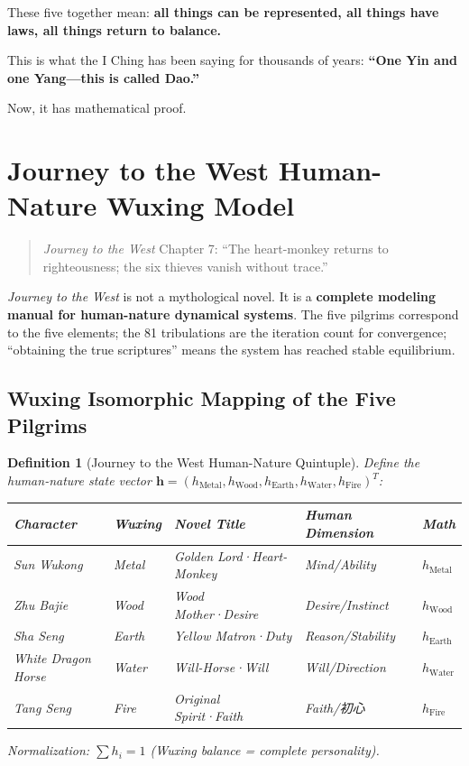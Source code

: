 \documentclass[conference]{IEEEtran}
\newtheorem{definition}[theorem]{Definition}
\theoremstyle{remark}
\begin{document}
These five together mean: \textbf{all things can be represented, all things have laws, all things return to balance.}

This is what the I Ching has been saying for thousands of years: \textbf{``One Yin and one Yang---this is called Dao.''}

Now, it has mathematical proof.

\section{Journey to the West Human-Nature Wuxing Model}

\begin{quote}
\emph{Journey to the West} Chapter 7: ``The heart-monkey returns to righteousness; the six thieves vanish without trace.''
\end{quote}

\emph{Journey to the West} is not a mythological novel. It is a \textbf{complete modeling manual for human-nature dynamical systems}. The five pilgrims correspond to the five elements; the 81 tribulations are the iteration count for convergence; ``obtaining the true scriptures'' means the system has reached stable equilibrium.

\subsection{Wuxing Isomorphic Mapping of the Five Pilgrims}

\begin{definition}[Journey to the West Human-Nature Quintuple]
Define the human-nature state vector $\mathbf{h} = (h_{\text{Metal}}, h_{\text{Wood}}, h_{\text{Earth}}, h_{\text{Water}}, h_{\text{Fire}})^T$:

\vspace{4pt}
\begin{tabular}{p{2cm}p{1cm}p{2cm}p{2.2cm}p{1.8cm}}
\toprule
Character & Wuxing & Novel Title & Human Dimension & Math \\
\midrule
Sun Wukong & Metal & Golden Lord·Heart-Monkey & Mind/Ability & $h_{\text{Metal}}$ \\
Zhu Bajie & Wood & Wood Mother·Desire & Desire/Instinct & $h_{\text{Wood}}$ \\
Sha Seng & Earth & Yellow Matron·Duty & Reason/Stability & $h_{\text{Earth}}$ \\
White Dragon Horse & Water & Will-Horse·Will & Will/Direction & $h_{\text{Water}}$ \\
Tang Seng & Fire & Original Spirit·Faith & Faith/初心 & $h_{\text{Fire}}$ \\
\bottomrule
\end{tabular}

Normalization: $\sum h_i = 1$ (Wuxing balance = complete personality).
\end{definition}
\end{document}
